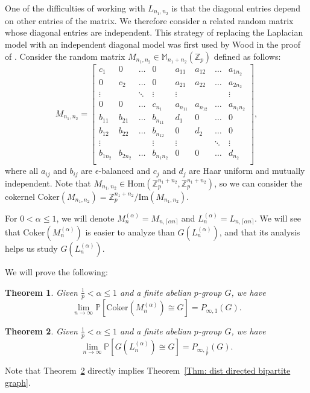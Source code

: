 \documentclass[12pt]{amsart}
\newtheorem{theorem}{Theorem}[section]
\theoremstyle{definition}
\newcommand{\PPP}{\mathbb{P}}
\newcommand{\PPb}[1]{\PPP\left[#1\right]}
\newcommand{\Mnot}{M_{n_1,n_2}}
\newcommand{\Lnot}{L_{n_1,n_2}}
\newcommand{\Mna}{M_{n}^{(\alpha)}}
\newcommand{\Lna}{L_{n}^{(\alpha)}}
\newcommand{\im}{\text{Im}}
\newcommand{\Zpnot}{\Z_p^{n_1+n_2}}
\newcommand{\Zp}{\Z_p}
\newcommand{\aln}{\lceil \alpha n\rceil}
\newcommand{\MM}{\mathbb{M}}
\newcommand{\Z}{\mathbb{Z}}
\newcommand{\Coker}{\text{Coker}}
\newcommand{\Hom}{\text{Hom}}
\begin{document}
One of the difficulties of working with $\Lnot$ is that the diagonal entries depend on other entries of the matrix. We therefore consider a related random matrix whose diagonal entries are independent.
This strategy of replacing the Laplacian model with an independent diagonal model was first used by Wood in the proof of \cite[Theorem 6.2]{wood2017distribution}.
Consider the random matrix $\Mnot\in \MM_{n_1+n_2}(\Z_p)$ defined as follows:
\[
\Mnot
=\begin{bmatrix}
c_1 & 0&  \dots & 0 & a_{11}& a_{12} & \dots & a_{1n_2}\\
0 & c_2 &\dots  & 0 & a_{21}& a_{22} & \dots & a_{2n_2}\\
\vdots & &\ddots & \vdots & \vdots & & & \vdots\\
0 & 0 &\dots  & c_{n_1} & a_{n_11}& a_{n_12} & \dots & a_{n_1n_2}\\
b_{11}& b_{21} & \dots & b_{n_11} &d_1 & 0&  \dots & 0 \\
b_{12}& b_{22} & \dots & b_{n_12} &0 & d_2 &\dots  & 0 \\
\vdots & & & \vdots &\vdots & &\ddots & \vdots \\
b_{1n_2}& b_{2n_2} & \dots & b_{n_1n_2} &0 & 0 &\dots  & d_{n_2}\\
\end{bmatrix},
\]
where all $a_{ij}$ and $b_{ij}$ are $\epsilon$-balanced and $c_j$ and $d_j$ are Haar uniform and mutually independent.
Note that $\Mnot\in\Hom(\Zp^{n_1+n_2},\Zp^{n_1+n_2})$, so we can consider the cokernel $\Coker(\Mnot)=\Zpnot/\im(\Mnot)$.
 

For $0<\alpha\leq 1$, we will denote $\Mna=M_{n,\aln}$ and $\Lna=L_{n,\aln}$.
We will see that $\Coker(\Mna)$ is easier to analyze than $G(\Lna)$, and that its analysis helps us study $G(\Lna)$.

We will prove the following:
\begin{theorem}\label{Thm: distribution ind diag}
Given $\frac{1}{p}<\alpha\leq 1$ and a finite abelian $p$-group $G$, we have
\[
\lim_{n\to\infty}
\PPb{\Coker(\Mna)\cong G}
=P_{\infty,1}(G).
\]    
\end{theorem}

\begin{theorem}\label{Thm: distribution Laplacian}
Given $\frac{1}{p}<\alpha\leq 1$ and a finite abelian $p$-group $G$, we have
\[
\lim_{n\to\infty}
\PPP[G(\Lna)\cong G]
=P_{\infty,\frac{1}{p}}(G).
\]    
\end{theorem}

Note that Theorem~\ref{Thm: distribution Laplacian} directly implies Theorem~\ref{Thm: dist directed bipartite graph}.
\end{document}
